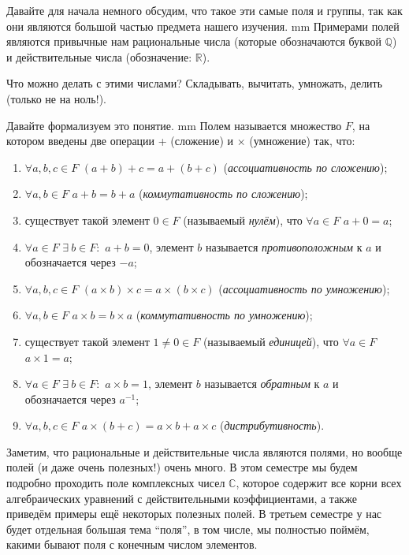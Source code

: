 \documentclass[12pt,english,russian]{article}
\begin{document}
	Давайте для начала немного обсудим, что такое эти самые поля и группы, так как они являются большой частью предмета нашего
	изучения.
	 mm
	Примерами полей являются привычные нам рациональные числа (которые обозначаются буквой $\mathbb{Q}$) и 
	действительные числа (обозначение: $\mathbb{R}$).

	Что можно делать с этими числами? Складывать, вычитать,
	умножать, делить (только не на ноль!).

	Давайте формализуем это понятие.
	 mm
	Полем называется множество $F$, на котором введены две операции + (сложение) и $\times$ (умножение) так, что:
	\begin{enumerate}
		\item $\forall a,b,c \in F$ $(a+b)+c = a+(b+c)$ (\textit{ассоциативность по сложению});
		\item $\forall a,b \in F$ $a+b = b+a$ (\textit{коммутативность по сложению});
		\item существует такой элемент $0 \in F$ (называемый \textit{нулём}), что $\forall a \in F$ $a+0 = a$;
		\item $\forall a \in F$ $\exists \ b \in F:$ $a+b = 0$, элемент $b$  называется \textit{противоположным} к $a$ и обозначается через $-a$;
		\item  $\forall a,b,c \in F$ $(a\times b)\times c = a\times(b\times c)$ (\textit{ассоциативность по умножению});
		\item $\forall a,b \in F$ $a\times b = b\times a$ (\textit{коммутативность по умножению});
		\item существует такой элемент $1 \ne 0 \in F$ (называемый \textit{единицей}), что $\forall a \in F$ $a \times 1 = a$;
		\item $\forall a \in F$ $\exists \ b \in F:$ $a \times b = 1$, элемент $b$  называется \textit{обратным} к $a$ и обозначается через $a^{-1}$;
		\item $\forall a,b,c \in F$ $a \times (b+c) = a \times b + a \times c$ (\textit{дистрибутивность}).
	\end{enumerate}

	Заметим, что рациональные и действительные числа являются
	полями, но вообще полей (и даже очень полезных!) очень много.
	В этом семестре мы будем подробно проходить поле комплексных чисел $\mathbb C$, которое содержит все корни всех алгебраических
	уравнений с действительными коэффициентами, а также приведём 
	примеры ещё некоторых полезных полей. В третьем семестре 
	у нас будет отдельная большая тема “поля”, в том числе, мы
	полностью поймём, какими бывают поля с конечным числом элементов.
\end{document}
